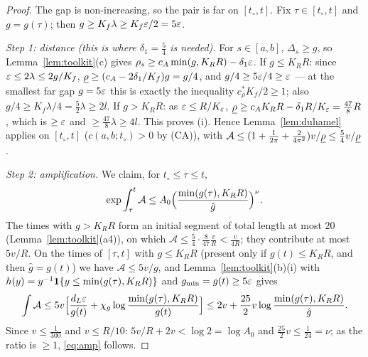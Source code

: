 \begin{proof}
The gap is non-increasing, so the pair is far on $[t_\circ,t]$. Fix $\tau\in[t_\circ,t]$ and $g=g(\tau)$; then
$g\ge K_f\lambda\ge K_f\varepsilon/2=5\varepsilon$.

\emph{Step 1: distance (this is where $\delta_1=\frac54$ is needed).} For $s\in[a,b]$, $\Delta_s\ge g$, so
Lemma~\ref{lem:toolkit}(c) gives $\rho_s\ge c_A\min(g,K_RR)-\delta_1\varepsilon$. If $g\le K_RR$: since
$\varepsilon\le2\lambda\le2g/K_f$, $\underline{\rho}\ge(c_A-2\delta_1/K_f)g=g/4$, and $g/4\ge5\varepsilon/4\ge\varepsilon$ --- at the smallest far gap
$g=5\varepsilon$ this is exactly the inequality $c_\rho^*K_f/2\ge1$; also $g/4\ge K_f\lambda/4=\frac52\lambda\ge2l$. If
$g>K_RR$: as $\varepsilon\le R/K_\varepsilon$, $\underline{\rho}\ge c_AK_RR-\delta_1R/K_\varepsilon=\frac{47}8R$, which is $\ge\varepsilon$ and
$\ge\frac{47}8\lambda\ge4l$. This proves (i). Hence Lemma~\ref{lem:duhamel} applies on $[t_\circ,t]$
($c(a,b;t_\circ)>0$ by (CA)), with $\mathcal A\le(1+\frac1{2\pi}+\frac2{4\pi^2})v/\underline{\rho}\le\frac54v/\underline{\rho}$.

\emph{Step 2: amplification.} We claim, for $t_\circ\le\tau\le t$,
\begin{equation}\label{eq:amp}
\exp\int_\tau^t\mathcal A\le A_0\Bigl(\frac{\min(g(\tau),K_RR)}{\hat g}\Bigr)^{\nu}.
\end{equation}
The times with $g>K_RR$ form an initial segment of total length at most $20$ (Lemma~\ref{lem:toolkit}(a4)), on which
$\mathcal A\le\frac54\cdot\frac8{47}\frac vR<\frac v{4R}$; they contribute at most $5v/R$. On the times of $[\tau,t]$ with
$g\le K_RR$ (present only if $g(t)\le K_RR$, and then $\hat g=g(t)$) we have $\mathcal A\le5v/g$, and
Lemma~\ref{lem:toolkit}(b)(i) with $h(y)=y^{-1}\mathbf{1}\{y\le\min(g(\tau),K_RR)\}$ and $g_{\min}=g(t)\ge5\varepsilon$ gives
\[
\int\mathcal A\le5v\Bigl[\frac{d_L\varepsilon}{g(t)}+\chi_g\log\frac{\min(g(\tau),K_RR)}{g(t)}\Bigr]
\le2v+\frac{25}2v\log\frac{\min(g(\tau),K_RR)}{\hat g}.
\]
Since $v\le\frac1{300}$ and $v\le R/10$: $5v/R+2v<\log2=\log A_0$ and $\frac{25}2v\le\frac1{24}=\nu$; as the ratio is
$\ge1$, \eqref{eq:amp} follows.


\end{proof}
